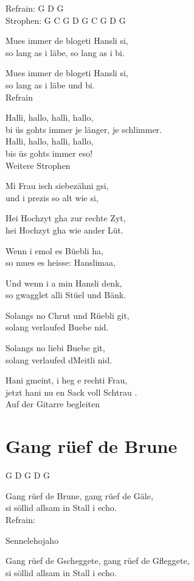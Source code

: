 \documentclass[
  letterpaper,
]{scrbook}
\begin{document}
Refrain: G D G\\
Strophen: G C G D G C G D G

Mues immer de blogeti Hansli si,\\
so lang as i läbe, so lang as i bi.

Mues immer de blogeti Hansli si,\\
so lang as i läbe und bi.\\
Refrain

Halli, hallo, halli, hallo,\\
bi üs gohts immer je länger, je schlimmer.\\
Halli, hallo, halli, hallo,\\
bis üs gohts immer eso!\\
Weitere Strophen

Mi Frau isch siebezähni gsi,\\
und i prezis so alt wie si,

Hei Hochzyt gha zur rechte Zyt,\\
hei Hochzyt gha wie ander Lüt.

Wenn i emol es Büebli ha,\\
so mues es heisse: Hanslimaa,

Und wenn i a min Hansli denk,\\
so gwagglet alli Stüel und Bänk.

Solangs no Chrut und Rüebli git,\\
solang verlaufed Buebe nid.

Solangs no liebi Buebe git,\\
solang verlaufed d\textquotesingle Meitli nid.

Hani gmeint, i heg e rechti Frau,\\
jetzt hani nu en Sack voll Schtrau .\\
Auf der Gitarre begleiten

\hypertarget{gang-ruxfcef-de-brune}{%
\chapter{Gang rüef de Brune}\label{gang-ruxfcef-de-brune}}

G D G D G

Gang rüef de Brune, gang rüef de Gäle,\\
si söllid allsam in Stall i echo.\\
Refrain:

Sennelehojaho

Gang rüef de Gscheggete, gang rüef de Gfleggete,\\
si söllid allsam in Stall i echo.
\end{document}
